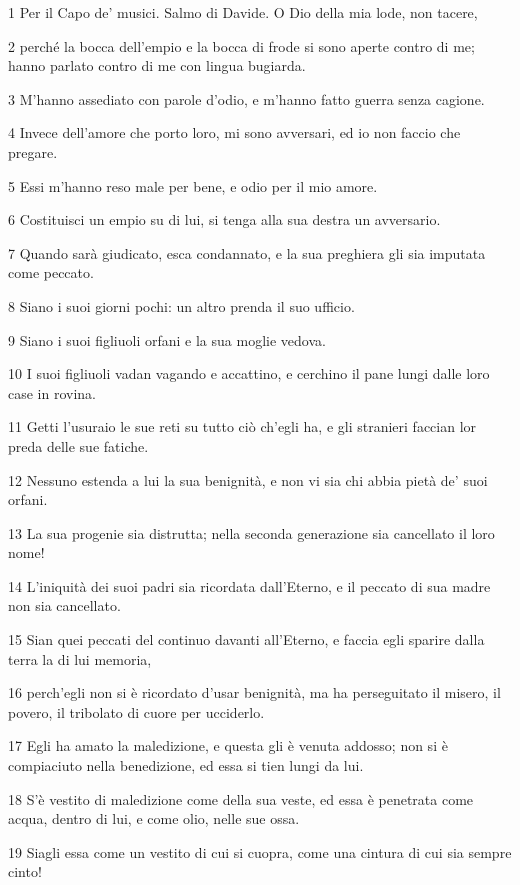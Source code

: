 \par 1 Per il Capo de' musici. Salmo di Davide. O Dio della mia lode, non tacere,
\par 2 perché la bocca dell'empio e la bocca di frode si sono aperte contro di me; hanno parlato contro di me con lingua bugiarda.
\par 3 M'hanno assediato con parole d'odio, e m'hanno fatto guerra senza cagione.
\par 4 Invece dell'amore che porto loro, mi sono avversari, ed io non faccio che pregare.
\par 5 Essi m'hanno reso male per bene, e odio per il mio amore.
\par 6 Costituisci un empio su di lui, si tenga alla sua destra un avversario.
\par 7 Quando sarà giudicato, esca condannato, e la sua preghiera gli sia imputata come peccato.
\par 8 Siano i suoi giorni pochi: un altro prenda il suo ufficio.
\par 9 Siano i suoi figliuoli orfani e la sua moglie vedova.
\par 10 I suoi figliuoli vadan vagando e accattino, e cerchino il pane lungi dalle loro case in rovina.
\par 11 Getti l'usuraio le sue reti su tutto ciò ch'egli ha, e gli stranieri faccian lor preda delle sue fatiche.
\par 12 Nessuno estenda a lui la sua benignità, e non vi sia chi abbia pietà de' suoi orfani.
\par 13 La sua progenie sia distrutta; nella seconda generazione sia cancellato il loro nome!
\par 14 L'iniquità dei suoi padri sia ricordata dall'Eterno, e il peccato di sua madre non sia cancellato.
\par 15 Sian quei peccati del continuo davanti all'Eterno, e faccia egli sparire dalla terra la di lui memoria,
\par 16 perch'egli non si è ricordato d'usar benignità, ma ha perseguitato il misero, il povero, il tribolato di cuore per ucciderlo.
\par 17 Egli ha amato la maledizione, e questa gli è venuta addosso; non si è compiaciuto nella benedizione, ed essa si tien lungi da lui.
\par 18 S'è vestito di maledizione come della sua veste, ed essa è penetrata come acqua, dentro di lui, e come olio, nelle sue ossa.
\par 19 Siagli essa come un vestito di cui si cuopra, come una cintura di cui sia sempre cinto!
